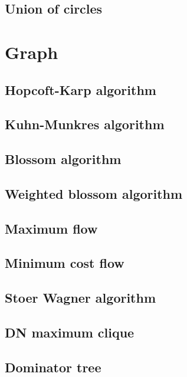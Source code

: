 \documentclass[titlepage, a4paper,10pt]{article}
\begin{document}
\begin{multicols}{2}
\begin{spacing}{0.6}
			\subsection{Union of circles}
				
		\section{Graph}
			\subsection{Hopcoft-Karp algorithm}
				
			\subsection{Kuhn-Munkres algorithm}
				
			\subsection{Blossom algorithm}
				
			\subsection{Weighted blossom algorithm}
				
			\subsection{Maximum flow}
				
			\subsection{Minimum cost flow}
				
			\subsection{Stoer Wagner algorithm}
				
			\subsection{DN maximum clique}
				
			\subsection{Dominator tree}
				

\end{spacing}
\end{multicols}
\end{document}
